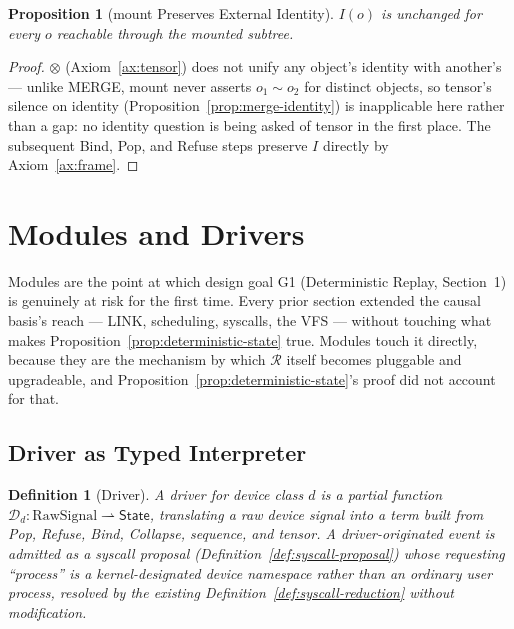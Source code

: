 \documentclass[11pt]{article}
\newtheorem{definition}{Definition}[section]
\newtheorem{proposition}{Proposition}[section]
\begin{document}
\begin{proposition}[mount Preserves External Identity]
\label{prop:mount-identity-v2}
$I(o)$ is unchanged for every $o$ reachable through the mounted subtree.
\end{proposition}
\begin{proof}
$\otimes$ (Axiom~\ref{ax:tensor}) does not unify any object's identity with another's --- unlike MERGE, mount never asserts $o_1 \sim o_2$ for distinct objects, so tensor's silence on identity (Proposition~\ref{prop:merge-identity}) is inapplicable here rather than a gap: no identity question is being asked of tensor in the first place. The subsequent Bind, Pop, and Refuse steps preserve $I$ directly by Axiom~\ref{ax:frame}.
\end{proof}

\section{Modules and Drivers}
\label{sec:modules}

Modules are the point at which design goal G1 (Deterministic Replay, Section~1) is genuinely at risk for the first time. Every prior section extended the causal basis's reach --- LINK, scheduling, syscalls, the VFS --- without touching what makes Proposition~\ref{prop:deterministic-state} true. Modules touch it directly, because they are the mechanism by which $\mathcal{R}$ itself becomes pluggable and upgradeable, and Proposition~\ref{prop:deterministic-state}'s proof did not account for that.

\subsection{Driver as Typed Interpreter}

\begin{definition}[Driver]
\label{def:driver}
A driver for device class $d$ is a partial function $\mathcal{D}_d : \mathrm{RawSignal} \rightharpoonup \mathsf{State}$, translating a raw device signal into a term built from Pop, Refuse, Bind, Collapse, sequence, and tensor. A driver-originated event is admitted as a syscall proposal (Definition~\ref{def:syscall-proposal}) whose requesting ``process'' is a kernel-designated device namespace rather than an ordinary user process, resolved by the existing Definition~\ref{def:syscall-reduction} without modification.
\end{definition}
\end{document}
